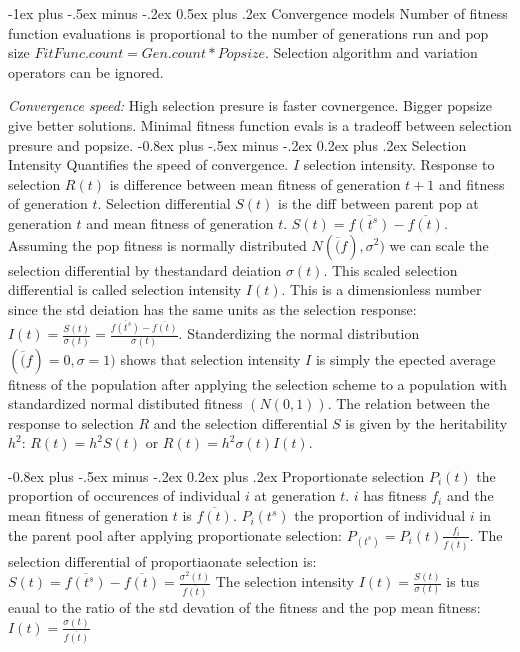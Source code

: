 \documentclass[8pt,landscape]{extarticle}
\makeatletter
\renewcommand{\section}{\@startsection{section}{1}{0mm}%
                                {-1ex plus -.5ex minus -.2ex}%
                                {0.5ex plus .2ex}%
                                {\normalfont\large\bfseries}}
\renewcommand{\subsection}{\@startsection{subsection}{2}{0mm}%
                                {-0.8ex plus -.5ex minus -.2ex}%
                                {0.2ex plus .2ex}%
                                {\normalfont\normalsize\bfseries}}
\makeatother
\begin{document}
\begin{multicols}{4}
\section{Convergence models}
Number of fitness function evaluations is proportional to the
number of generations run and pop size $FitFunc.count = Gen.count * Popsize$.
Selection algorithm and variation operators can be ignored.

\emph{Convergence speed:}
High selection presure is faster covnergence. Bigger popsize give better solutions.
Minimal fitness function evals is a tradeoff between selection presure and popsize.
\subsection{Selection Intensity}
Quantifies the speed of convergence. $I$ selection intensity. Response to
selection $R(t)$ is difference between mean fitness of generation $t+1$ and fitness
of generation $t$. Selection differential $S(t)$ is the diff between parent pop
at generation $t$ and mean fitness of generation $t$. 
$S(t)=\overline{f(t^s)}-\overline{f(t)}$. Assuming the pop fitness is normally
distributed $N(\overline(f),\sigma^2)$ we can scale the selection differential
by thestandard deiation $\sigma(t)$. This scaled selection differential is 
called selection intensity $I(t)$. This is a dimensionless number since 
the std deiation has the same units as the selection response:
$I(t)=\frac{S(t)}{\sigma(t)}=\frac{\overline{f(t^s)}-\overline{f(t)}}{\sigma(t)}$.
Standerdizing the normal distribution $(\overline(f)=0,\sigma=1)$ shows that
selection intensity $I$ is simply the epected average fitness
of the population after applying the selection scheme to a population
with standardized normal distibuted fitness $(N(0,1))$.
The relation between the response to selection $R$ and the selection
differential $S$ is given by the heritability $h^2$: $R(t)=h^2S(t)$ or
$R(t)=h^2\sigma(t)I(t)$.

\subsection{Proportionate selection}
$P_i(t)$ the proportion of occurences of individual $i$ at generation $t$.
$i$ has fitness $f_i$ and the mean fitness of generation $t$ is $\overline{f(t)}$.
$P_i(t^s)$ the proportion of individual $i$ in the parent pool
after applying proportionate selection: $P_(t^s)=P_i(t)\frac{f_i}{\overline{f(t)}}$.
The selection differential of proportiaonate selection is: 
$S(t)=\overline{f(t^s)}-\overline{f(t)}=\frac{\sigma^2(t)}{\overline{f(t)}}$
The selection intensity $I(t)=\frac{S(t)}{\sigma(t)}$ is tus eaual
to the ratio of the std devation of the fitness and the pop mean fitness:
$I(t)=\frac{\sigma(t)}{\overline{f(t)}}$


\end{multicols}
\end{document}
